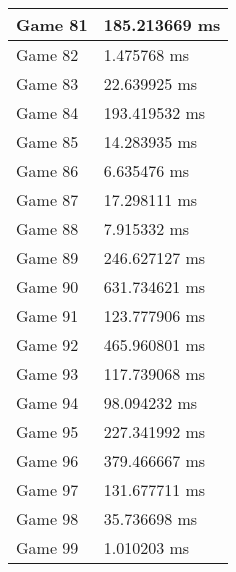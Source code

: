 \begin{tabular}{|l|l|}
	Game 81 & 185.213669 ms \\ \hline
	Game 82 & 1.475768 ms \\ \hline
	Game 83 & 22.639925 ms \\ \hline
	Game 84 & 193.419532 ms \\ \hline
	Game 85 & 14.283935 ms \\ \hline
	Game 86 & 6.635476 ms \\ \hline
	Game 87 & 17.298111 ms \\ \hline
	Game 88 & 7.915332 ms \\ \hline
	Game 89 & 246.627127 ms \\ \hline
	Game 90 & 631.734621 ms \\ \hline
	Game 91 & 123.777906 ms \\ \hline
	Game 92 & 465.960801 ms \\ \hline
	Game 93 & 117.739068 ms \\ \hline
	Game 94 & 98.094232 ms \\ \hline
	Game 95 & 227.341992 ms \\ \hline
	Game 96 & 379.466667 ms \\ \hline
	Game 97 & 131.677711 ms \\ \hline
	Game 98 & 35.736698 ms \\ \hline
	Game 99 & 1.010203 ms \\ \hline
\end{tabular}
